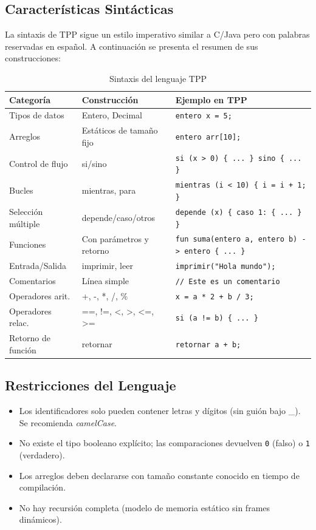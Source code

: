 \subsection{Características Sintácticas}

La sintaxis de TPP sigue un estilo imperativo similar a C/Java pero con palabras reservadas en español. A continuación se presenta el resumen de sus construcciones:

\begin{table}[H]
\centering
\begin{tabular}{llp{6cm}}
\toprule
\textbf{Categoría} & \textbf{Construcción} & \textbf{Ejemplo en TPP} \\
\midrule
Tipos de datos & Entero, Decimal & \texttt{entero x = 5;} \\
Arreglos & Estáticos de tamaño fijo & \texttt{entero arr[10];} \\
Control de flujo & si/sino & \texttt{si (x > 0) \{ ... \} sino \{ ... \}} \\
Bucles & mientras, para & \texttt{mientras (i < 10) \{ i = i + 1; \}} \\
Selección múltiple & depende/caso/otros & \texttt{depende (x) \{ caso 1: \{ ... \} \}} \\
Funciones & Con parámetros y retorno & \texttt{fun suma(entero a, entero b) -> entero \{ ... \}} \\
Entrada/Salida & imprimir, leer & \texttt{imprimir("Hola mundo");} \\
Comentarios & Línea simple & \texttt{// Este es un comentario} \\
Operadores arit. & +, -, *, /, \% & \texttt{x = a * 2 + b / 3;} \\
Operadores relac. & ==, !=, <, >, <=, >= & \texttt{si (a != b) \{ ... \}} \\
Retorno de función & retornar & \texttt{retornar a + b;} \\
\bottomrule
\end{tabular}
\caption{Sintaxis del lenguaje TPP}
\label{tab:sintaxis-tpp}
\end{table}

\subsection{Restricciones del Lenguaje}

\begin{itemize}
    \item Los identificadores solo pueden contener letras y dígitos (sin guión bajo \_). Se recomienda \textit{camelCase}.
    \item No existe el tipo booleano explícito; las comparaciones devuelven \texttt{0} (falso) o \texttt{1} (verdadero).
    \item Los arreglos deben declararse con tamaño constante conocido en tiempo de compilación.
    \item No hay recursión completa (modelo de memoria estático sin frames dinámicos).
\end{itemize}


